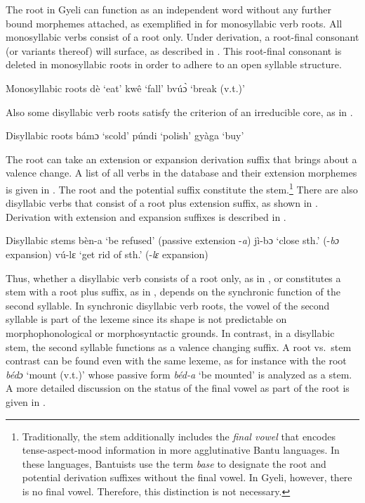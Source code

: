 The root in Gyeli can function as an independent word without any further bound morphemes attached, as exemplified in  for monosyllabic verb roots. All monosyllabic verbs consist of a root only. Under derivation, a root-final consonant (or variants thereof) will surface, as described in . This root-final consonant is deleted in monosyllabic roots in order to adhere to an open syllable structure.

\ea \label{Vroot1} Monosyllabic roots
  \ea  dè `eat'
\ex kwê `fall'
\ex bvúɔ̀ `break (v.t.)'
\z
\z

\noindent  Also some disyllabic verb roots satisfy the criterion of an irreducible core, as in .


\ea \label{Vroot2} Disyllabic roots
  \ea  bámɔ `scold'
\ex púndi `polish'
\ex gyàga `buy'
\z
\z

The root can take an extension or expansion derivation suffix that brings about a valence change. A list of all verbs in the database and their extension morphemes is given in  .
The root and the potential suffix constitute the stem.\footnote{Traditionally, the stem additionally includes the {\itshape final vowel} that encodes tense-aspect-mood information in more agglutinative Bantu languages. In these languages, Bantuists use the term {\itshape base} to designate the root and potential derivation suffixes without the final vowel. In Gyeli, however, there is no final vowel. Therefore, this distinction is not necessary.}
There are also disyllabic verbs that consist of a root plus extension suffix, as shown in . Derivation with extension and expansion suffixes is described in .

\ea \label{Vroot3} Disyllabic stems
  \ea   bèn-a `be refused' (passive extension -{\itshape a})
\ex\label{Vroot3b} jì-bɔ `close sth.' (-{\itshape bɔ} expansion)
\ex\label{Vroot3c} vú-lɛ `get rid of sth.' (-{\itshape lɛ} expansion)
\z
\z

Thus, whether a disyllabic verb consists of a root only, as in , or constitutes a stem with a root plus suffix, as in , depends on the synchronic function of the second syllable.   In synchronic disyllabic verb roots, the vowel of the second syllable is part of the lexeme since its shape is not predictable on morphophonological or morphosyntactic grounds. In contrast, in a disyllabic stem, the second syllable functions as a valence changing suffix. A root vs.\ stem contrast can be found even with the same lexeme, as for instance with the root {\itshape bédɔ} `mount (v.t.)' whose passive form {\itshape béd-a} `be mounted' is analyzed as a stem.
A more detailed discussion on the status of the final vowel as part of the root is given in .

